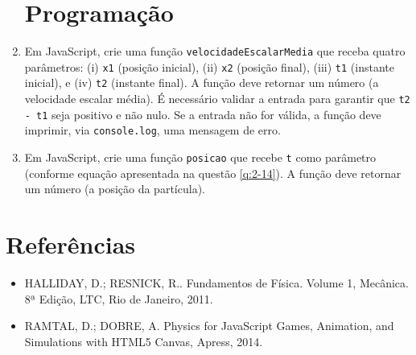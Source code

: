 \documentclass[12pt,a4paper,oneside]{article}
\begin{document}
\begin{enumerate}
\section{Programação}

	\item Em JavaScript, crie uma função {\tt velocidadeEscalarMedia} que receba quatro parâmetros: (i) {\tt x1} (posição inicial), (ii) {\tt x2} (posição final), (iii) {\tt t1} (instante inicial), e (iv) {\tt t2} (instante final). A função deve retornar um número (a velocidade escalar média). É necessário validar a entrada para garantir que  {\tt t2 - t1} seja positivo e não nulo. Se a entrada não for válida, a função deve imprimir, via {\tt console.log}, uma mensagem de erro.
	
	\item Em JavaScript, crie uma função {\tt posicao} que recebe {\tt t} como parâmetro (conforme equação apresentada na questão \ref{q:2-14}). A função deve retornar um número (a posição da partícula).
		
\end{enumerate}

\section{Referências}

\begin{itemize}
	\item HALLIDAY, D.; RESNICK, R.. Fundamentos de Física. Volume 1, Mecânica. 8ª Edição, LTC, Rio de Janeiro, 2011.

	\item RAMTAL, D.; DOBRE, A. Physics for JavaScript Games, Animation, and Simulations with HTML5 Canvas, Apress, 2014.
\end{itemize}
\end{document}
